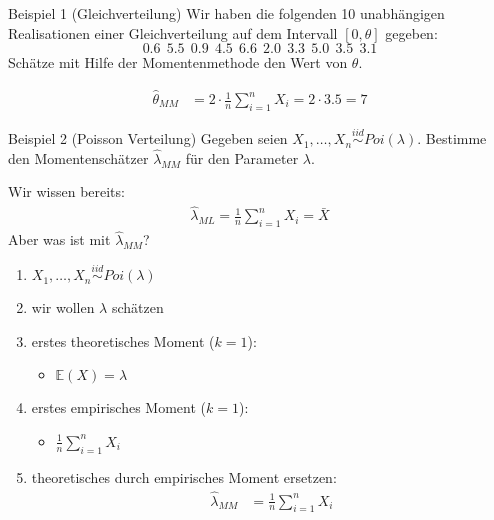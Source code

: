 \documentclass[t,11pt,aspectratio=169]{beamer}
\begin{document}
\begin{frame}
\begin{block}{Beispiel 1 (Gleichverteilung)}
	Wir haben die folgenden 10 unabhängigen Realisationen einer Gleichverteilung auf dem Intervall $[0,\theta]$ gegeben:
	$$0.6 \ \ 5.5 \ \ 0.9 \ \ 4.5 \ \ 6.6 \ \ 2.0 \ \ 3.3 \ \ 5.0 \ \ 3.5 \ \ 3.1$$
	Schätze mit Hilfe der Momentenmethode den Wert von $\theta$.
\end{block}
\pause 
\begin{align*}
\hat{\theta}_{MM} &= 2\cdot\frac{1}{n}\sum_{i=1}^{n}X_i = 2\cdot 3.5 = 7
\end{align*}
\end{frame}

\begin{frame}
\begin{block}{Beispiel 2 (Poisson Verteilung)}
	Gegeben seien $X_1,\dots,X_n\overset{iid}{\sim}Poi(\lambda)$. Bestimme den Momentenschätzer $\hat{\lambda}_{MM}$ für den Parameter $\lambda$.
\end{block}
\pause
Wir wissen bereits:
\begin{align*}
\hat{\lambda}_{ML}=\frac{1}{n} \sum_{i=1}^{n} X_i=\bar{X}
\end{align*}
\pause
Aber was ist mit $\hat{\lambda}_{MM}$?
\end{frame}

\begin{frame}
\begin{enumerate}[<+->]
\item $X_1,\dots,X_n\overset{iid}{\sim}Poi(\lambda)$
\item wir wollen $\lambda$ schätzen
\item erstes theoretisches Moment ($k=1$):
\begin{itemize}
\item $\mathbb{E}(X) = \lambda	$
\end{itemize}
\item erstes empirisches Moment ($k=1$):
\begin{itemize}
\item $\frac{1}{n}\sum_{i=1}^{n}X_i$
\end{itemize}
\item theoretisches durch empirisches Moment ersetzen:
\begin{align*}
\hat{\lambda}_{MM} &= \frac{1}{n}\sum_{i=1}^{n}X_i
\end{align*}
\end{enumerate}
\end{frame}
\end{document}
